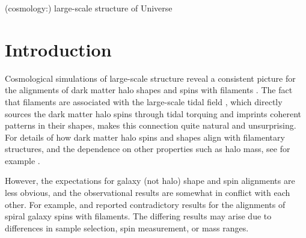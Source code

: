 \documentclass[usenatbib,useAMS]{mnras}
\theoremstyle{remark}
\newcommand{\rachel}[1]{{\textcolor{cyan}{RM: #1}}}
\newcommand{\jab}[1]{{\textcolor{red}{JAB: #1}}}
\begin{document}
\begin{keywords}
(cosmology:) large-scale structure of Universe
\end{keywords}


\section{Introduction}

Cosmological simulations of large-scale structure reveal a consistent picture for the alignments of
dark matter halo shapes and spins with filaments \citep[for a review of galaxy and halo alignments, see][]{2015SSRv..193....1J}.
The fact that filaments are associated with the large-scale tidal field
\citep{2007MNRAS.375..489H,2007MNRAS.381...41H, 2008MNRAS.383.1655S,2009MNRAS.396.1815F,
  2010MNRAS.408.2163A, Cautun2012}, which directly sources the dark matter halo spins through tidal
torquing and imprints coherent patterns in their shapes, makes this connection quite natural and
unsurprising.  For details of how dark matter halo spins and shapes align with filamentary
structures, and the dependence on other properties such as halo mass, see for example \citet{2006MNRAS.370.1422A,2007ApJ...655L...5A,hahn+07,2009ApJ...706..747Z,2013MNRAS.428.2489L,2014MNRAS.440L..46A,2018arXiv180500033G}.

However, the expectations for galaxy (not halo) shape and spin alignments are less obvious, and the
observational results are somewhat in conflict with each other.  For example,
\citet{2013ApJ...775L..42T} and \citet{2015ApJ...798...17Z} reported contradictory results for the
alignments of spiral galaxy spins with filaments.  The differing results may arise due to
differences in sample selection, spin measurement, or mass ranges.  %
\end{document}
